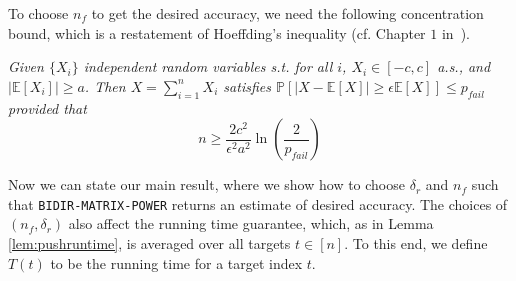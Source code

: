 To choose $n_f$ to get the desired accuracy, we need the following concentration bound, which is a restatement of Hoeffding's inequality (cf. Chapter $1$ in~\cite{dubhashi2009concentration}).
\begin{lemma}
\label{lem:hoeff}
\emph{
Given $\{X_i\}$ independent random variables s.t. for all $i$, $X_i \in [-c, c]$ a.s., and $|\mathbb{E}[X_i]| \geq a$. 
Then $X = \sum_{i= 1}^n X_i$ satisfies
$\mathbb{P}[|X - \mathbb{E}[X]| \geq \epsilon \mathbb{E}[X] ] \leq p_{fail}$ provided that
$$n \geq \frac{2c^2}{\epsilon^2 a^2}\ln\left(\frac{2}{p_{fail}} \right)$$
}
\end{lemma}

\begin{comment}
\begin{proof}
Let $X = \sum_{i=1}^n X_i$.  Since $E[X] = nE[X_i]$, $E[X] \geq n \epsilon a$. Let $t = \epsilon a$.
\begin{align*}
\mathbb{P}\left[|X - \mathbb{E}[X]| \geq \epsilon \mathbb{E}[X] \right] 
&\leq \mathbb{P}\left[|X - \mathbb{E}[X]| \geq nt \right] \\
&= \mathbb{P}\left[\left|\frac{1}{n}X - \frac{1}{n}\mathbb{E}[X]\right| \geq t \right]  
\end{align*}
Applying Hoeffding's inequality to the rightmost term above, we obtain
  \[\mathbb{P}\left[|X - \mathbb{E}[X]| \geq \epsilon \mathbb{E}[X] \right] \leq 2\exp \left(-\frac{2n^2t^2}{\sum_{i=1}^n(b_i - a_i)^2}\right) \]
  Hence substituting the values for $t$ and $b_i = c$, $a_i = -c$ gives us:
\[\mathbb{P}\left[|X - \mathbb{E}[X]| \geq \epsilon \mathbb{E}[X] \right] \leq 2\exp \left(-\frac{2n^2\epsilon^2a^2}{n(4c^2)}\right) \]
Now set this upperbound to $p_{fail}$ to obtain the relation:
$$ \frac{n \epsilon^2 a^2}{2c^2} = \ln\left(\frac{2}{p_{fail}} \right) $$
Thus, for $n \geq \frac{2c^2}{\epsilon^2 a^2}\ln\left(\frac{2}{p_{fail}} \right)$, we are guaranteed that $\mathbb{P}\left[|X - \mathbb{E}[X]| \geq \epsilon \mathbb{E}[X] \right] \leq p_{fail}$.

Note that if we require the failure conditions to hold for $\lm$ sets of $X's$, then we perform a simple union bound which adds a $\lm$ in the $\frac{2}{p_{fail}}$ term.
\end{proof} 
\end{comment}


Now we can state our main result, where we show how to choose $\delta_r$ and $n_f$ such that \texttt{BIDIR-MATRIX-POWER} returns an estimate of desired accuracy. 
The choices of $(n_f,\delta_r)$ also affect the running time guarantee, which, as in Lemma \ref{lem:pushruntime}, is averaged over all targets $t\in[n]$. 
To this end, we define $T(t)$ to be the running time for a target index $t$. 

